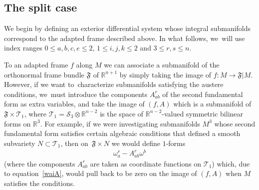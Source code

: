 \documentclass[pdftex]{sigma}
\def\R{\mathbb{R}}
\def\calS{\mathcal{S}}
\def\calT{\mathcal{T}}
\def\F{\mathfrak{F}}
\def\w{\omega}
\numberwithin{equation}{section}
\begin{document}
\subsection{The split case} \label{splitsec}

We begin by defining an exterior differential system whose integral submanifolds correspond to the adapted frame described above. In what follows, we~will use index ranges $0\le a,b,c,e \le 2$, $1\le i,j,k\le 2$ and $3 \le r,s \le n$.

To an adapted frame $f$ along $M$ we can associate a submanifold of the orthonormal frame bundle $\F$ of $\R^{n+1}$ by simply taking the image of $f\colon M \to \F|M$. However, if we want to~cha\-rac\-te\-rize submanifolds satisfying the austere conditions, we~must introduce the components $A^r_{ab}$ of the second fundamental form as extra variables, and take the image of $(f,A)$ which is a submanifold of $\F \times \calT_1$, where $\calT_1 = \calS_3 \otimes \R^{n-2}$ is the space of $\R^{n-2}$-valued symmetric bilinear forms on $\R^3$. For example, if we were investigating submanifolds $M^3$ whose second fundamental form satisfies certain algebraic conditions that defined a smooth subvariety $N \subset \calT_1$, then on~$\F\times N$ we would define $1$-forms
\begin{gather*}
\w^r_a - A^r_{ab} \w^b
\end{gather*}
(where the components $A^r_{ab}$ are taken as coordinate functions on $\calT_1$) which, due to equation~\eqref{waiA}, would pull back to be zero on the image of $(f,A)$ when $M$ satisfies the conditions.
\end{document}
